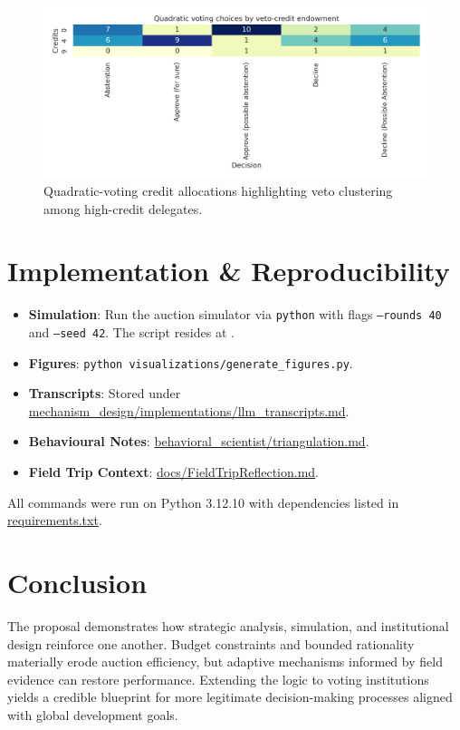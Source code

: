\documentclass[11pt]{article}
\begin{document}
\begin{figure}[htbp]
  \centering
  \includegraphics[width=0.85\linewidth]{../visualizations/voting/credit_option_heatmap.png}
  \caption{Quadratic-voting credit allocations highlighting veto clustering among high-credit delegates.}
  \label{fig:credit-option-heatmap}
\end{figure}

\section{Implementation \& Reproducibility}
\begin{itemize}[leftmargin=*]
  \item \textbf{Simulation}: Run the auction simulator via \texttt{python} with flags \texttt{--rounds 40} and \texttt{--seed 42}. The script resides at .
  \item \textbf{Figures}: \texttt{python visualizations/generate\_figures.py}.
  \item \textbf{Transcripts}: Stored under \href{../mechanism_design/implementations/llm_transcripts.md}{mechanism\_design/implementations/llm\_transcripts.md}.
  \item \textbf{Behavioural Notes}: \href{../behavioral_scientist/triangulation.md}{behavioral\_scientist/triangulation.md}.
  \item \textbf{Field Trip Context}: \href{FieldTripReflection.md}{docs/FieldTripReflection.md}.
\end{itemize}
All commands were run on Python 3.12.10 with dependencies listed in \href{../requirements.txt}{requirements.txt}.

\section{Conclusion}
The proposal demonstrates how strategic analysis, simulation, and institutional design reinforce one another. Budget constraints and bounded rationality materially erode auction efficiency, but adaptive mechanisms informed by field evidence can restore performance. Extending the logic to voting institutions yields a credible blueprint for more legitimate decision-making processes aligned with global development goals.
\end{document}
